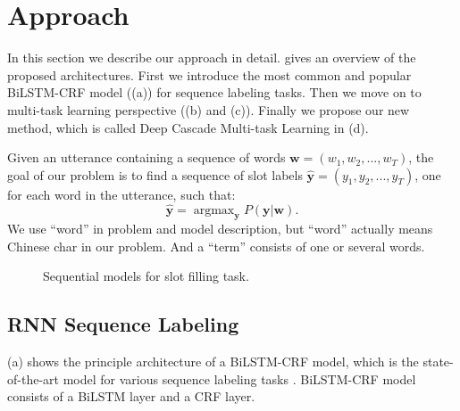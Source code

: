 \section{Approach}
\label{sec:model}
In this section we describe our approach in detail.
 gives an overview of the proposed architectures.
First we introduce the most common and popular BiLSTM-CRF
model ((a)) for sequence labeling tasks.
Then we move on to multi-task learning perspective 
((b) and (c)).
Finally we propose our new method, which is called
Deep Cascade Multi-task Learning in (d).

Given an utterance containing a sequence of
words
$\textbf{w} = (w_1, w_2, ..., w_T)$,
the goal of our problem
is to find a sequence of slot labels $\hat{\textbf{y}} = (y_1, y_2, ..., y_T)$, 
one for each word in the utterance, such that:
\begin{equation*}
\hat{\textbf{y}} = \mathop{\arg\max}_{\textbf{y}}P(\textbf{y}|\textbf{w}).
\end{equation*}
We use ``word'' in problem and model description,
but ``word'' actually means Chinese char in our problem.
And a ``term'' consists of one or several words.
\begin{figure}[th]
	\centering
	\caption{Sequential models for slot filling task.}
	\label{fig:model}
\end{figure}

\subsection{RNN Sequence Labeling}
\label{sec:rnn_sequence_labeling}

(a) 
shows the principle architecture of a BiLSTM-CRF model,
which is the state-of-the-art model for various sequence labeling tasks \cite{huang2015bidirectional,reimers2017optimal}.
BiLSTM-CRF model consists of a BiLSTM layer and a CRF layer. 

